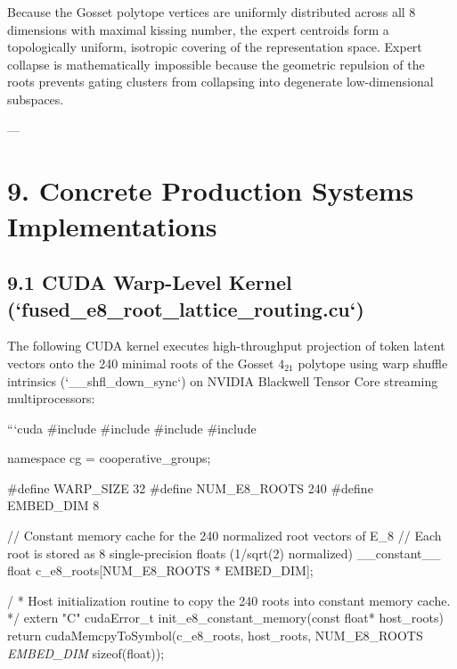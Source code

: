 \documentclass[11pt,twoside,openright]{amsbook}
\begin{document}
Because the Gosset polytope vertices are uniformly distributed across all 8 dimensions with maximal kissing number, the expert centroids form a topologically uniform, isotropic covering of the representation space. Expert collapse is mathematically impossible because the geometric repulsion of the roots prevents gating clusters from collapsing into degenerate low-dimensional subspaces.

---

\section{9. Concrete Production Systems Implementations}

\subsection{9.1 CUDA Warp-Level Kernel (`fused_e8_root_lattice_routing.cu`)}

The following CUDA kernel executes high-throughput projection of token latent vectors onto the 240 minimal roots of the Gosset $4_{21}$ polytope using warp shuffle intrinsics (`__shfl_down_sync`) on NVIDIA Blackwell Tensor Core streaming multiprocessors:

```cuda
#include 
#include 
#include 
#include 

namespace cg = cooperative_groups;

#define WARP_SIZE 32
#define NUM_E8_ROOTS 240
#define EMBED_DIM 8

// Constant memory cache for the 240 normalized root vectors of E_8
// Each root is stored as 8 single-precision floats (1/sqrt(2) normalized)
__constant__ float c_e8_roots[NUM_E8_ROOTS * EMBED_DIM];

/\textit{}
 * Host initialization routine to copy the 240 roots into constant memory cache.
 */
extern "C" cudaError_t init_e8_constant_memory(const float* host_roots) {
    return cudaMemcpyToSymbol(c_e8_roots, host_roots, NUM_E8_ROOTS \textit{ EMBED_DIM } sizeof(float));
}
\end{document}
